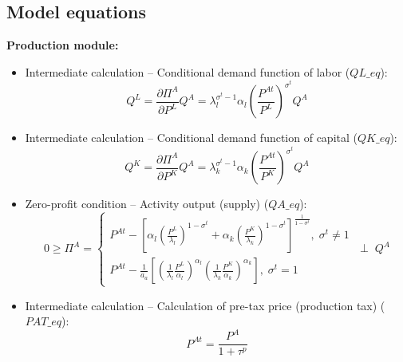 \documentclass[12pt, a4paper]{article}
\numberwithin{equation}{section}
\numberwithin{figure}{section}
\numberwithin{table}{section}
\begin{document}
\subsection{Model equations}\label{v2.0-equations}
\textbf{Production module:}
\begin{itemize}
	\item Intermediate calculation -- Conditional demand function of labor (\(QL\_eq\)): 
	\begin{equation}
		Q^L = \frac{\partial\Pi^A}{\partial P^L}Q^A = \lambda_{l}^{\sigma^t-1}\alpha_{l}\left(\frac{P^{At}}{P^L}\right)^{\sigma^{t}}Q^A
	\end{equation}
	\item Intermediate calculation -- Conditional demand function of capital (\(QK\_eq\)): 
	\begin{equation}
		Q^K = \frac{\partial\Pi^A}{\partial P^K}Q^A = \lambda_{k}^{\sigma^t-1}\alpha_{k}\left(\frac{P^{At}}{P^K}\right)^{\sigma^{t}}Q^A
	\end{equation}
	\item Zero-profit condition -- Activity output (supply) (\(QA\_eq\)): 
	\begin{equation}
		0\geq\Pi^A = 
		\begin{cases}
		 P^{At}-\left[\alpha_{l}\left(\frac{P^L}{\lambda_{l}}\right)^{1-\sigma^t}+\alpha_{k}\left(\frac{P^K}{\lambda_{k}}\right)^{1-\sigma^t}\right]^{\frac{1}{1-\sigma^t}},\; \sigma^t\ne1\\
		 P^{At}-\frac{1}{a_a}\left[\left(\frac{1}{\lambda_{l}}\frac{P^L}{\alpha_l}\right)^{\alpha_{l}}\left(\frac{1}{\lambda_{k}}\frac{P^K}{\alpha_k}\right)^{\alpha_{k}}\right],\; \sigma^t=1
		\end{cases}
		\;\perp\; Q^A
	\end{equation}
	\item Intermediate calculation -- Calculation of pre-tax price (production tax) (\(PAT\_eq\)): 
	\begin{equation}
		P^{At} = \frac{P^A}{1+\tau^p}
	\end{equation}
\end{itemize}
\end{document}

